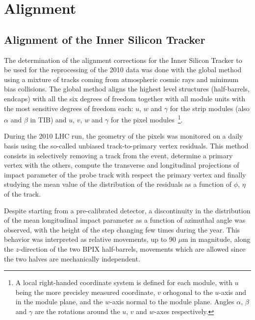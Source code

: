 \cleardoublepage
\section{Alignment \label{sec:alignment}}

\subsection{Alignment of the Inner Silicon Tracker}
The determination of the alignment corrections for the Inner Silicon
Tracker to be used for the reprocessing of the 2010 data was done with
the global method~\cite{TkAl_VBlobel,TkAl_Millepede} using a mixture of tracks coming
from atmospheric cosmic rays and minimum bias collisions. 
The global method aligns the highest level structures (half-barrels, endcaps) with all
the six degrees of freedom together with all module units with the most sensitive 
degrees of freedom each: $u$, $w$ and $\gamma$ for the strip modules (also $\alpha$ and $\beta$ in TIB)
and $u$, $v$, $w$ and $\gamma$ for the pixel modules~\footnote{
A local right-handed coordinate system is defined for each module, with $u$ being the
more precisley measured coordinate, $v$ orhogonal to the $u$-axis and in the 
module plane, and the $w$-axis normal to the module plane. Angles $\alpha$, $\beta$ and $\gamma$ are the rotations
around the $u$, $v$ and $w$-axes respectively.}.

During the 2010 LHC run, the geometry of the pixels was monitored on a
daily basis  using the so-called unbiased track-to-primary vertex
residuals. This method consists in selectively
removing a track from the event, determine a primary vertex with the
others, compute the transverse and longitudinal projections of impact
parameter of the probe track with respect the primary vertex and
finally studying the mean value of the distribution of the residuals
as a function of $\phi$, $\eta$ of the track.

Despite starting from a pre-calibrated detector, a discontinuity in
the distribution of the mean longitudinal impact parameter as a
function of azimuthal angle was observed, with the height of the step changing
few times during the year. 
This behavior was interpreted as relative movements, up to 90 $\mu$m in
magnitude, along the $z$-direction of the two BPIX half-barrels,
movements which are allowed since the two halves are mechanically independent.

